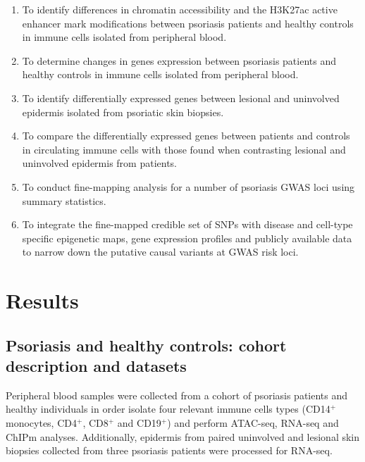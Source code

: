 \begin{enumerate}
\item To identify differences in chromatin accessibility and the H3K27ac active enhancer mark modifications between psoriasis patients and healthy controls in immune cells isolated from peripheral blood.
\item To determine changes in genes expression between psoriasis patients and healthy controls in immune cells isolated from peripheral blood.
\item To identify differentially expressed genes between lesional and uninvolved epidermis isolated from psoriatic skin biopsies. 
\item To compare the differentially expressed genes between patients and controls  in circulating immune cells with those found when contrasting lesional and uninvolved epidermis from patients. 
\item To conduct fine-mapping analysis for a number of psoriasis GWAS loci using summary statistics.
\item To integrate the fine-mapped credible set of SNPs with disease and cell-type specific epigenetic maps, gene expression profiles and publicly available data to narrow down the putative causal variants at GWAS risk loci.
\end{enumerate}


\section{Results}
\subsection{Psoriasis and healthy controls: cohort description and datasets}
Peripheral blood samples were collected from a cohort of psoriasis patients and healthy individuals in order isolate four relevant immune cells types (CD14$^+$ monocytes, CD4$^+$, CD8$^+$ and CD19$^+$) and perform ATAC-seq, RNA-seq and ChIPm analyses. Additionally, epidermis from paired uninvolved and lesional skin biopsies collected from three psoriasis patients were processed for RNA-seq.


